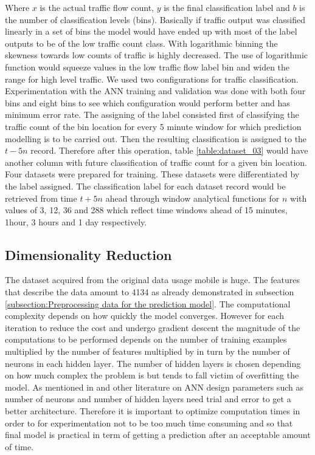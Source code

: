 \documentclass[12pt, a4paper]{report}
\theoremstyle{definition}
\theoremstyle{definition}%
\theoremstyle{definition}%
\theoremstyle{definition}%
\theoremstyle{definition}%
\theoremstyle{definition}%
\begin{document}
Where $x$ is the actual traffic flow count, $y$ is the final classification label and $b$ is the number of classification levels (bins). 
Basically if traffic output was classified linearly in a set of bins the model would have ended up with most of the label outputs to be of the low traffic count class. With logarithmic binning the skewness towards low counts of traffic is highly decreased. The use of logarithmic function would squeeze values in the low traffic flow label bin and widen the range for high level traffic. We used two configurations for traffic classification. Experimentation with the ANN training and validation was done with both four bins and eight bins to see which configuration would perform better and has minimum error rate. The assigning of the label consisted first of classifying the traffic count of the bin location for every 5 minute window for which prediction modelling is to be carried out.  Then the resulting classification is assigned to the $t - 5n$ record. Therefore after this operation, table \ref{table:dataset_03} would have another column with future classification of traffic count for a given bin location. Four datasets were prepared for training. These datasets were differentiated by the label assigned. The classification label for each dataset record would be retrieved from time $t+5n$ ahead through window analytical functions for $n$ with values of 3, 12, 36 and 288 which reflect time windows ahead of 15 minutes, 1hour, 3 hours and 1 day respectively.   






\subsection{Dimensionality Reduction}
The dataset acquired from the original data usage mobile is huge. The features that describe the data amount to 4134 as already demonstrated in subsection \ref{subsection:Preprocessing data for the prediction model}. The computational complexity depends on how quickly the model converges. However for each iteration to reduce the cost and undergo gradient descent the magnitude of the computations to be performed depends on the number of training examples multiplied by the number of features multiplied by in turn by the number of neurons in each hidden layer. The number of hidden layers is chosen depending on how much complex the problem is but tends to fall victim of overfitting the model. As mentioned in \cite{Jain1996} and other literature on ANN design parameters such as number of neurons and number of hidden layers need trial and error to get a better architecture. Therefore it is important to optimize computation times in order to for experimentation not to be too much time consuming and so that final model is practical in term of getting a prediction after an acceptable amount of time.
\end{document}

